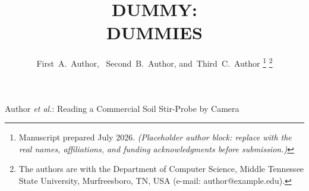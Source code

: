 ﻿\documentclass[journal]{IEEEtran}
\begin{document}
\title{DUMMY: \\
DUMMIES}

\author{First~A.~Author,~
        Second~B.~Author,
        and~Third~C.~Author%
\thanks{Manuscript prepared July 2026. \emph{(Placeholder author block: replace with the real names, affiliations, and funding acknowledgments before submission.)}}
\thanks{The authors are with the Department of Computer Science, Middle Tennessee State University, Murfreesboro, TN, USA (e-mail: author@example.edu).}}

%
{Author \MakeLowercase{\textit{et al.}}: Reading a Commercial Soil Stir-Probe by Camera}

\maketitle
\end{document}
